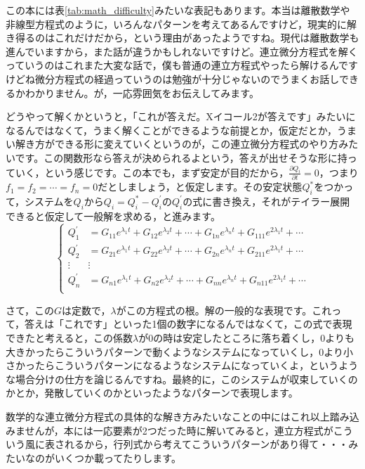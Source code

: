 \documentclass{ltjsbook}
\begin{document}
この本には表\ref{tab:math_difficulty}みたいな表記もあります。本当は離散数学や非線型方程式のように，いろんなパターンを考えてあるんですけど，現実的に解き得るのはこれだけだから，という理由があったようですね。現代は離散数学も進んでいますから，また話が違うかもしれないですけど。連立微分方程式を解くっていうのはこれまた大変な話で，僕も普通の連立方程式やったら解けるんですけどね微分方程式の経過っていうのは勉強が十分じゃないのでうまくお話しできるかわかりません。が，一応雰囲気をお伝えしてみます。

どうやって解くかというと，「これが答えだ。Xイコール2が答えです」みたいになるんではなくて，うまく解くことができるような前提とか，仮定だとか，うまい解き方ができる形に変えていくというのが，この連立微分方程式のやり方みたいです。この関数形なら答えが決められるよという，答えが出せそうな形に持っていく，という感じです。この本でも，まず安定が目的だから，$\frac{\partial Q_i}{\partial t}=0$，つまり$f_1=f_2=\cdots = f_n=0$だとしましょう，と仮定します。その安定状態$Q_i^{\ast}$をつかって，システムを$Q_i$から$Q_i = Q_i^{\ast} - Q_i^{\prime}$の$Q_i^{\prime}$の式に書き換え，それがテイラー展開できると仮定して一般解を求める，と進みます。
\[
\left\{
    \begin{array}{ccc}
        Q_1^{\prime} &= G_{11}e^{\lambda_1t} + G_{12}e^{\lambda_2t} + \cdots + G_{1n}e^{\lambda_nt} + G_{111}e^{2\lambda_1t}+ \cdots \\
        Q_2^{\prime} &= G_{21}e^{\lambda_1t} + G_{22}e^{\lambda_2t} + \cdots + G_{2n}e^{\lambda_nt} + G_{211}e^{2\lambda_1t}+ \cdots \\
        \vdots &  \vdots\\
        Q_n^{\prime} &= G_{n1}e^{\lambda_1t} + G_{n2}e^{\lambda_2t} + \cdots + G_{nn}e^{\lambda_nt} + G_{n11}e^{2\lambda_1t}+ \cdots \\
    \end{array}
\right.
\]

さて，この$G$は定数で，$\lambda$がこの方程式の根。解の一般的な表現です。これって，答えは「これです」といった1個の数字になるんではなくて，この式で表現できたと考えると，この係数$\lambda$が0の時は安定したところに落ち着くし，0よりも大きかったらこういうパターンで動くようなシステムになっていくし，0より小さかったらこういうパターンになるようなシステムになっていくよ，というような場合分けの仕方を論じるんですね。最終的に，このシステムが収束していくのかとか，発散していくのかといったようなパターンで表現します。

数学的な連立微分方程式の具体的な解き方みたいなことの中にはこれ以上踏み込みませんが，本には一応要素が2つだった時に解いてみると，連立方程式がこういう風に表されるから，行列式から考えてこういうパターンがあり得て・・・みたいなのがいくつか載ってたりします。
\end{document}
